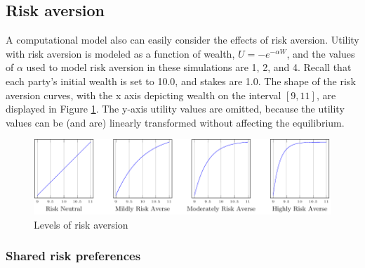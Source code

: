 \documentclass{article}
\begin{document}
\subsection{Risk aversion}

A computational model also can easily consider the effects of risk aversion. Utility with risk aversion is modeled as a function of wealth, $U=-e^{-\alpha W}$, and the values of $\alpha$ used to model risk aversion in these simulations are 1, 2, and 4. Recall that each party's initial wealth is set to 10.0, and stakes are 1.0. The shape of the risk aversion curves, with the x axis depicting wealth on the interval $[9, 11]$,  are displayed in Figure \ref{fig:riskaversion}. The y-axis utility values are omitted, because the utility values can be (and are) linearly transformed without affecting the equilibrium. 

\begin{figure}[h!]
\centering
\includegraphics[scale=0.40, trim={0in 0in 0in 0in}, clip]{../Figures/risk aversion.pdf}
\caption{Levels of risk aversion}
\label{fig:riskaversion}
\end{figure}

\subsubsection{Shared risk preferences}
\end{document}
